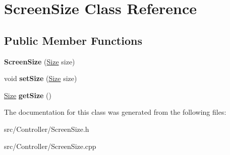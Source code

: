 \hypertarget{classScreenSize}{}\section{Screen\+Size Class Reference}
\label{classScreenSize}
\subsection*{Public Member Functions}
\begin{DoxyCompactItemize}
\item 
{\bfseries Screen\+Size} (\hyperlink{classPoint}{Size} size)\hypertarget{classScreenSize_a7469af2a4878377008bd55a91dd30638}{}\label{classScreenSize_a7469af2a4878377008bd55a91dd30638}

\item 
void {\bfseries set\+Size} (\hyperlink{classPoint}{Size} size)\hypertarget{classScreenSize_aae2a13d81a99fa24ed6ac7d0f4a8a6ec}{}\label{classScreenSize_aae2a13d81a99fa24ed6ac7d0f4a8a6ec}

\item 
\hyperlink{classPoint}{Size} {\bfseries get\+Size} ()\hypertarget{classScreenSize_a36c743767c3803a71ed9f987c4f0bb78}{}\label{classScreenSize_a36c743767c3803a71ed9f987c4f0bb78}

\end{DoxyCompactItemize}


The documentation for this class was generated from the following files\+:\begin{DoxyCompactItemize}
\item 
src/\+Controller/Screen\+Size.\+h\item 
src/\+Controller/Screen\+Size.\+cpp\end{DoxyCompactItemize}

